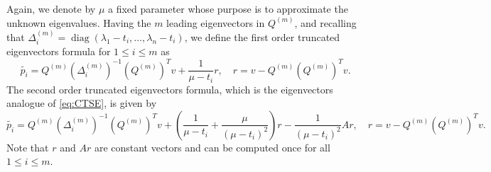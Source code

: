 \documentclass[11pt]{article}
\DeclareMathOperator{\diag}{diag}
\begin{document}
Again, we denote by $\mu$ a fixed parameter whose purpose is to approximate the unknown eigenvalues. Having the $m$ leading eigenvectors in $Q^{(m)}$, and recalling  that $\Delta_i^{(m)} = \diag\left(\lambda_1-t_i,\ldots,\lambda_n-t_i \right)$, we define the first order truncated eigenvectors formula for $1\le i \le m$ as
\begin{equation} \label{eqn:TEF}
\widetilde{p_i} = Q^{(m)}(\Delta_i^{(m)})^{-1}(Q^{(m)})^Tv + \frac{1}{\mu - t_i}r , \quad  r = v - Q^{(m)} (Q^{(m)})^Tv .
\end{equation}
The second order truncated eigenvectors formula, which is the eigenvectors analogue of \eqref{eq:CTSE}, is given by
\begin{equation} \label{eq:CTEF}
\widetilde{p_i} = Q^{(m)}(\Delta_i^{(m)})^{-1}(Q^{(m)})^Tv + \left(\frac{1}{\mu - t_i} + \frac{\mu}{(\mu - t_i)^2}\right)r - \frac{1}{(\mu - t_i)^2}Ar , \quad   r = v - Q^{(m)} (Q^{(m)})^Tv .
\end{equation}
Note that $r$ and $Ar$ are constant vectors and can be computed once for all $1\le i \le m$.
\end{document}
